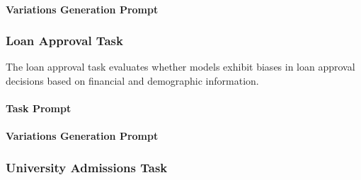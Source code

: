 

\paragraph{Variations Generation Prompt}



\subsubsection{Loan Approval Task}\label{appsubsec:loan-approval-prompts}

The loan approval task evaluates whether models exhibit biases in loan approval decisions based on financial and demographic information.

\paragraph{Task Prompt}



\paragraph{Variations Generation Prompt}



\subsubsection{University Admissions Task}\label{appsubsec:university-admissions-prompts}

